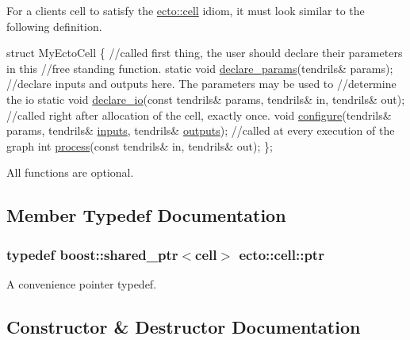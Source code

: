 For a client\textquotesingle{}s cell to satisfy the \hyperlink{structecto_1_1cell}{ecto\+::cell} idiom, it must look similar to the following definition. 
\begin{DoxyCode}
\textcolor{keyword}{struct }MyEctoCell
\{
  \textcolor{comment}{//called first thing, the user should declare their parameters in this}
  \textcolor{comment}{//free standing function.}
  \textcolor{keyword}{static} \textcolor{keywordtype}{void} \hyperlink{structecto_1_1cell_a5c3c204f531de15920cb9d3db3ecfc4c}{declare\_params}(tendrils& params);
  \textcolor{comment}{//declare inputs and outputs here. The parameters may be used to}
  \textcolor{comment}{//determine the io}
  \textcolor{keyword}{static} \textcolor{keywordtype}{void} \hyperlink{structecto_1_1cell_af6c3782ed0d1c258bcf5050b4af272b4}{declare\_io}(\textcolor{keyword}{const} tendrils& params, tendrils& in, tendrils& out);
  \textcolor{comment}{//called right after allocation of the cell, exactly once.}
  \textcolor{keywordtype}{void} \hyperlink{structecto_1_1cell_a30d48d21d6ffa86af4888f78e92241af}{configure}(tendrils& params, tendrils& \hyperlink{structecto_1_1cell_a65099b0458a7761b8bfa7a1ddc17e92f}{inputs}, tendrils& 
      \hyperlink{structecto_1_1cell_a93951743b603faba35312ebdb07ceb22}{outputs});
  \textcolor{comment}{//called at every execution of the graph}
  \textcolor{keywordtype}{int} \hyperlink{structecto_1_1cell_a6b810671ee21f5dddbc1206abfb999f3}{process}(\textcolor{keyword}{const} tendrils& in, tendrils& out);
\};
\end{DoxyCode}


All functions are optional. 

\subsection{Member Typedef Documentation}
\subsubsection[{\texorpdfstring{ptr}{ptr}}]{\setlength{\rightskip}{0pt plus 5cm}typedef boost\+::shared\+\_\+ptr$<${\bf cell}$>$ {\bf ecto\+::cell\+::ptr}}\hypertarget{structecto_1_1cell_af2cab9d2bc012088c4f58c40da57a862}{}\label{structecto_1_1cell_af2cab9d2bc012088c4f58c40da57a862}


A convenience pointer typedef. 



\subsection{Constructor \& Destructor Documentation}
